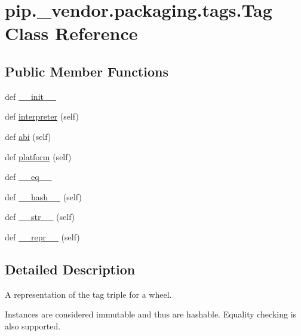 \hypertarget{classpip_1_1__vendor_1_1packaging_1_1tags_1_1Tag}{}\section{pip.\+\_\+vendor.\+packaging.\+tags.\+Tag Class Reference}
\label{classpip_1_1__vendor_1_1packaging_1_1tags_1_1Tag}
\subsection*{Public Member Functions}
\begin{DoxyCompactItemize}
\item 
def \hyperlink{classpip_1_1__vendor_1_1packaging_1_1tags_1_1Tag_a70ad7cba19bcea250a6c7a261f3c900f}{\+\_\+\+\_\+init\+\_\+\+\_\+}
\item 
def \hyperlink{classpip_1_1__vendor_1_1packaging_1_1tags_1_1Tag_ab9cd6457dc03efce193d05d2aea205a9}{interpreter} (self)
\item 
def \hyperlink{classpip_1_1__vendor_1_1packaging_1_1tags_1_1Tag_acefb8cf67d6786d271e58b9959ab587b}{abi} (self)
\item 
def \hyperlink{classpip_1_1__vendor_1_1packaging_1_1tags_1_1Tag_a01076d9d1318a7bba5fb9bf344b3d7f9}{platform} (self)
\item 
def \hyperlink{classpip_1_1__vendor_1_1packaging_1_1tags_1_1Tag_a79c9117214006324feeda3d66c501447}{\+\_\+\+\_\+eq\+\_\+\+\_\+}
\item 
def \hyperlink{classpip_1_1__vendor_1_1packaging_1_1tags_1_1Tag_aba0d7b1959e689a679bf656145ca5172}{\+\_\+\+\_\+hash\+\_\+\+\_\+} (self)
\item 
def \hyperlink{classpip_1_1__vendor_1_1packaging_1_1tags_1_1Tag_a61474196a29e837dfa8742ae912c3521}{\+\_\+\+\_\+str\+\_\+\+\_\+} (self)
\item 
def \hyperlink{classpip_1_1__vendor_1_1packaging_1_1tags_1_1Tag_a1cf3928025f2354fb9264f1e8dcb79f1}{\+\_\+\+\_\+repr\+\_\+\+\_\+} (self)
\end{DoxyCompactItemize}


\subsection{Detailed Description}
\begin{DoxyVerb}A representation of the tag triple for a wheel.

Instances are considered immutable and thus are hashable. Equality checking
is also supported.
\end{DoxyVerb}
 

